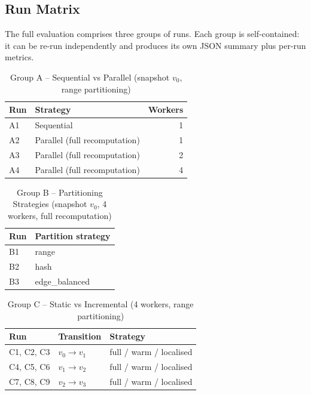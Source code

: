 \documentclass[11pt,a4paper]{article}
\begin{document}
\subsection{Run Matrix}
The full evaluation comprises three groups of runs. Each group is
self-contained: it can be re-run independently and produces its own
JSON summary plus per-run metrics.

\begin{table}[H]
\centering
\caption{Group A -- Sequential vs Parallel (snapshot $v_0$, range partitioning)}
\label{tab:groupA_setup}
\begin{tabular}{llr}
\toprule
\textbf{Run} & \textbf{Strategy} & \textbf{Workers} \\
\midrule
A1 & Sequential                         & 1 \\
A2 & Parallel (full recomputation)      & 1 \\
A3 & Parallel (full recomputation)      & 2 \\
A4 & Parallel (full recomputation)      & 4 \\
\bottomrule
\end{tabular}
\end{table}

\begin{table}[H]
\centering
\caption{Group B -- Partitioning Strategies (snapshot $v_0$, 4 workers, full recomputation)}
\label{tab:groupB_setup}
\begin{tabular}{ll}
\toprule
\textbf{Run} & \textbf{Partition strategy} \\
\midrule
B1 & range \\
B2 & hash \\
B3 & edge\_balanced \\
\bottomrule
\end{tabular}
\end{table}

\begin{table}[H]
\centering
\caption{Group C -- Static vs Incremental (4 workers, range partitioning)}
\label{tab:groupC_setup}
\begin{tabular}{lll}
\toprule
\textbf{Run} & \textbf{Transition} & \textbf{Strategy} \\
\midrule
C1, C2, C3 & $v_0 \to v_1$ & full / warm / localised \\
C4, C5, C6 & $v_1 \to v_2$ & full / warm / localised \\
C7, C8, C9 & $v_2 \to v_3$ & full / warm / localised \\
\bottomrule
\end{tabular}
\end{table}
\end{document}
